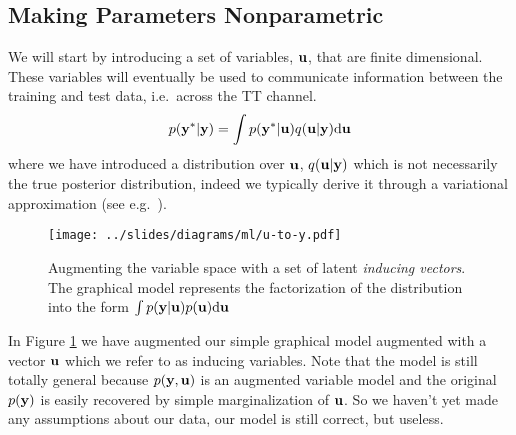 \documentclass[a4paperpaper,]{article}
\begin{document}
\hypertarget{making-parameters-nonparametric}{%
\subsection{Making Parameters
Nonparametric}\label{making-parameters-nonparametric}}


We will start by introducing a set of variables, \(\mathbf{ u}\),
that are finite dimensional. These variables will eventually be used to
communicate information between the training and test data, i.e.~across
the TT channel. \[
p(\mathbf{ y}^*|\mathbf{ y}) = \int p(\mathbf{ y}^*|\mathbf{ u}) q(\mathbf{ u}|\mathbf{ y}) \text{d}\mathbf{ u}
\] where we have introduced a distribution over \(\mathbf{ u}\),
\(q(\mathbf{ u}|\mathbf{ y})\) which is not necessarily the true
posterior distribution, indeed we typically derive it through a variational approximation (see e.g.~\citet{Titsias:variational09}).

\begin{figure}[htb]
\texttt{[image: ../slides/diagrams/ml/u-to-y.pdf]}


\caption{Augmenting the variable space with a set of latent \emph{inducing vectors}. The graphical model represents the factorization of the distribution into the form $\int p(\mathbf{ y}|\mathbf{ u})p(\mathbf{ u})\text{d}\mathbf{ u}$}
\label{u-to-y}
\end{figure}

In Figure \ref{u-to-y} we have augmented our simple graphical model
augmented with a vector \(\mathbf{ u}\) which we refer to as
inducing variables. Note that the model is still totally general because
\(p(\mathbf{ y}, \mathbf{ u})\) is an augmented variable model and
the original \(p(\mathbf{ y})\) is easily recovered by simple
marginalization of \(\mathbf{ u}\). So we haven't yet made any
assumptions about our data, our model is still correct, but useless.
\end{document}
